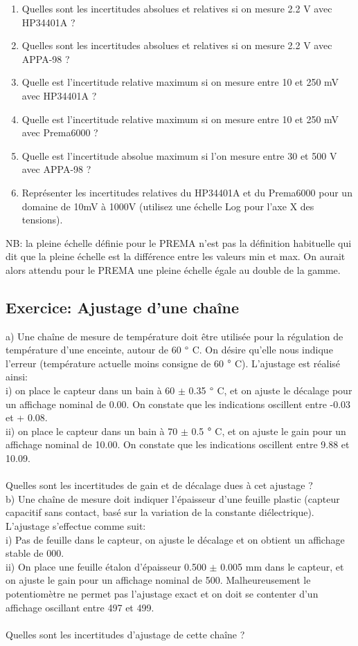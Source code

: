 \documentclass[main.tex]{subfiles}
\begin{document}
\begin{enumerate}
    \item Quelles sont les incertitudes absolues et relatives si on mesure 2.2 V avec HP34401A ?
    \item Quelles sont les incertitudes absolues et relatives si on mesure 2.2 V avec APPA-98 ?
    \item Quelle est l'incertitude relative maximum si on mesure entre 10 et 250 mV avec HP34401A ?
    \item Quelle est l'incertitude relative maximum si on mesure entre 10 et 250 mV avec Prema6000 ?
    \item Quelle est l'incertitude absolue maximum si l'on mesure entre 30 et 500 V avec APPA-98 ?
    \item Représenter les incertitudes relatives du HP34401A et du Prema6000 pour un domaine de 10mV à 1000V (utilisez une échelle Log pour l'axe X des tensions).
\end{enumerate}
NB: la pleine échelle définie pour le PREMA n'est pas la définition habituelle qui dit que la pleine échelle est la différence entre les valeurs min et max. On aurait alors attendu pour le PREMA une pleine échelle égale au double de la gamme.

\subsection{Exercice: Ajustage d'une chaîne}
a)	Une chaîne de mesure de température doit être utilisée pour la régulation de température d'une enceinte, autour de 60 $\degree$ C. On désire qu'elle nous indique l'erreur (température actuelle moins consigne de 60 $\degree$ C). L'ajustage est réalisé ainsi: \\
i)	on place le capteur dans un bain à 60 $\pm$ 0.35 $\degree$ C, et on ajuste le décalage pour un affichage nominal de 0.00. On constate que les indications oscillent entre -0.03 et + 0.08. \\
ii)	on place le capteur dans un bain à 70 $\pm$ 0.5 $\degree$ C, et on ajuste le gain pour un affichage nominal de 10.00. On constate que les indications oscillent entre 9.88 et 10.09. \\  ~ \\
Quelles sont les incertitudes de gain et de décalage dues à cet ajustage ? \\

b)	Une chaîne de mesure doit indiquer l'épaisseur d'une feuille plastic (capteur capacitif sans contact, basé sur la variation de la constante diélectrique). L'ajustage s'effectue comme suit: \\
i)	Pas de feuille dans le capteur, on ajuste le décalage et on obtient un affichage stable de 000. \\
ii)	On place une feuille étalon d'épaisseur 0.500  $\pm$  0.005 mm dans le capteur, et on ajuste le gain pour un affichage nominal de 500. Malheureusement le potentiomètre ne permet pas l'ajustage exact et on doit se contenter d'un affichage oscillant entre 497 et 499. \\~ \\
Quelles sont les incertitudes d'ajustage de cette chaîne ? \\
\end{document}
